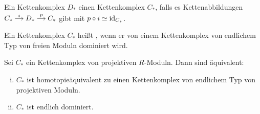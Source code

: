 \begin{definition}[{name=[dominierender Kettenkomplex]}]
	Ein Kettenkomplex $D_*$  einen Kettenkomplex $C_*$, falls es Kettenabbildungen \(
		\begin{tikzcd}[cramped,sep=small]
			C_* \rar["i"] & D_* \rar["p"] & C_*
		\end{tikzcd}
	\) gibt mit $p \circ i \simeq \operatorname{id}_{C_*}$.
\end{definition}

\begin{definition}[{name=[endlich dominiert]}]
	Ein Kettenkomplex $C_*$ heißt , wenn er von einem Kettenkomplex von endlichem Typ von freien Moduln dominiert wird. 
\end{definition}

\begin{satz}
	Sei $C_*$ ein Kettenkomplex von projektiven $R$-Moduln.
	Dann sind äquivalent:
	\begin{enumerate}[(i)]
		\item $C_*$ ist homotopieäquivalent zu einen Kettenkomplex von endlichem Typ von projektiven Moduln.
		\item $C_*$ ist endlich dominiert.
	\end{enumerate}
\end{satz}
